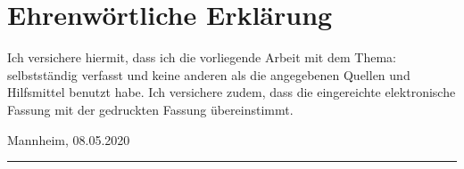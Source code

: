 
\clearpage
\chapter*{Ehrenwörtliche Erklärung}


Ich versichere hiermit, dass ich die vorliegende Arbeit mit dem Thema: \textit{\DerTitelDerArbeit} selbstständig verfasst und keine anderen als die angegebenen Quellen und Hilfsmittel benutzt habe. Ich versichere zudem, dass die eingereichte elektronische Fassung mit der gedruckten Fassung übereinstimmt.


\vspace{3cm}
\noindent Mannheim, 08.05.2020 \hfill\rule{5cm}{.4pt}\par
\noindent\hfill \DerAutorDerArbeit
